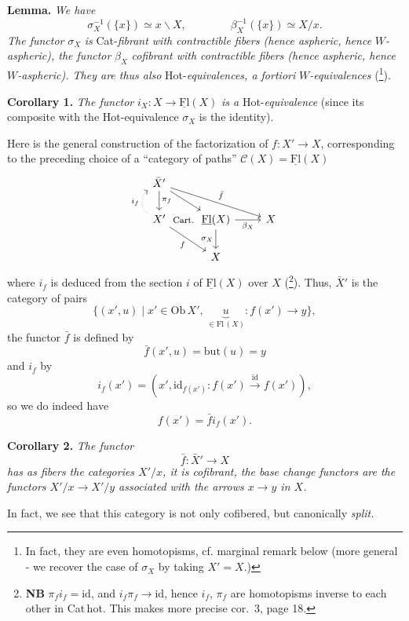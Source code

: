 \documentclass[11pt]{article}
\newcommand{\printedpage}[1]{\marginpar{\footnotesize p.~#1}}
\newcommand{\msp}[1]{\marginpar{\footnotesize [#1]}}
\newcommand{\cat}[1]{\underline{\mathrm{#1}}}
\begin{document}
\msp{page 17}
\textbf{Lemma.} \textit{We have}
\[
\sigma_X^{-1}(\{x\}) \simeq x\backslash X, \qquad\qquad \beta_X^{-1}(\{x\}) \simeq X/x.
\]
\textit{The functor} $\sigma_X$ \textit{is} Cat-\textit{fibrant with contractible fibers (hence aspheric, hence} $W$\textit{-aspheric), the functor} $\beta_X$ \textit{cofibrant with contractible fibers (hence aspheric, hence} $W$\textit{-aspheric). They are thus also} Hot-\textit{equivalences, a fortiori} $W$\textit{-equivalences} (\footnote[8]{In fact, they are even homotopisms, cf. marginal remark below (more general - we recover the case of $\sigma_X$ by taking $X' = X$.)}).

\textbf{Corollary 1.} \textit{The functor} $i_X : X \longrightarrow \cat{Fl}(X)$ \textit{is a} Hot-\textit{equivalence} (since its composite with the Hot-equivalence $\sigma_X$ is the identity).

\printedpage{11}
Here is the general construction of the factorization of $f : X' \longrightarrow X$, corresponding to the preceding choice of a ``category of paths'' $\mathcal{C}(X) = \cat{Fl}(X)$
\[
\begin{tikzcd}
\bar{X}' \arrow[d, "\pi_f"] \arrow[rd] \arrow[rrd, "\bar{f}"] & & \\
X' \arrow[u, dotted, bend left=60, "i_f"] \arrow[rd, "f"'] \arrow[r, phantom, "\text{\footnotesize Cart.}"] & \cat{Fl}(X) \arrow[r, "\beta_X"'] \arrow[d, "\sigma_X"'] & X \\
& X &
\end{tikzcd}
\]
where $i_f$ is deduced from the section $i$ of $\cat{Fl}(X)$ over $X$ (\footnote[9]{\textbf{NB} $\pi_f i_f = \mathrm{id}$, and $i_f\pi_f \longrightarrow \mathrm{id}$, hence $i_f$, $\pi_f$ are homotopisms inverse to each other in Cat\,hot. This makes more precise cor.~3, page 18.}). Thus, $\bar{X}'$ is the category of pairs
\[
\{(x',u) \mid x' \in \mathrm{Ob}\,X',\ \underbrace{u}_{\in\mathrm{Fl}\,(X)} : f(x') \longrightarrow y\},
\]
the functor $\bar{f}$ is defined by
\[
\bar{f}(x',u) = \mathrm{but}(u) = y
\]
and $i_f$ by
\[
i_f(x') = (x', \mathrm{id}_{f(x')} : f(x') \xrightarrow{\mathrm{id}} f(x')),
\]
so we do indeed have
\[
f(x') = \bar{f} i_f(x').
\]

\msp{page 18}
\textbf{Corollary 2.} \textit{The functor}
\[
\bar{f} : \bar{X}' \longrightarrow X
\]
\textit{has as fibers the categories $X'/x$, it is cofibrant, the base change functors are the functors $X'/x \longrightarrow X'/y$ associated with the arrows $x \longrightarrow y$ in $X$.}

In fact, we see that this category is not only cofibered, but canonically \textit{split.}
\end{document}
